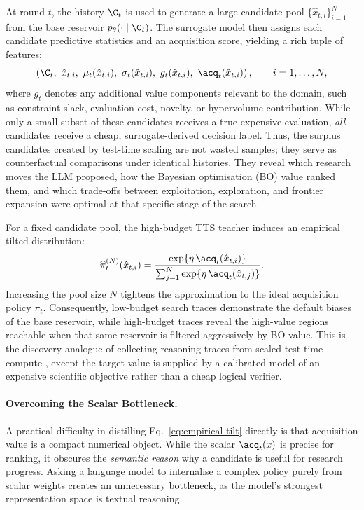 At round $t$, the history $\C_t$ is used to generate a large candidate pool $\{\hat{x}_{t,i}\}_{i=1}^{N}$ from the base reservoir $p_{\theta}(\cdot\mid\C_t)$. The surrogate model then assigns each candidate predictive statistics and an acquisition score, yielding a rich tuple of features:
\[
  \left(
    \C_t,\ \hat{x}_{t,i},\ 
    \mu_t(\hat{x}_{t,i}),\ 
    \sigma_t(\hat{x}_{t,i}),\ 
    g_t(\hat{x}_{t,i}),\ 
    \acq_t(\hat{x}_{t,i})
  \right),
  \qquad i=1,\ldots,N,
\]
where $g_t$ denotes any additional value components relevant to the domain, such as constraint slack, evaluation cost, novelty, or hypervolume contribution. While only a small subset of these candidates receives a true expensive evaluation, \emph{all} candidates receive a cheap, surrogate-derived decision label. Thus, the surplus candidates created by test-time scaling are not wasted samples; they serve as counterfactual comparisons under identical histories. They reveal which research moves the LLM proposed, how the Bayesian optimisation (BO) value ranked them, and which trade-offs between exploitation, exploration, and frontier expansion were optimal at that specific stage of the search.

For a fixed candidate pool, the high-budget TTS teacher induces an empirical tilted distribution:
\begin{equation}
\label{eq:empirical-tilt}
  \widehat{\pi}^{(N)}_t(\hat{x}_{t,i})
  =
  \frac{\exp\{\eta\,\acq_t(\hat{x}_{t,i})\}}
       {\sum_{j=1}^{N}\exp\{\eta\,\acq_t(\hat{x}_{t,j})\}} .
\end{equation}
Increasing the pool size $N$ tightens the approximation to the ideal acquisition policy $\pi_t$. Consequently, low-budget search traces demonstrate the default biases of the base reservoir, while high-budget traces reveal the high-value regions reachable when that same reservoir is filtered aggressively by BO value. This is the discovery analogue of collecting reasoning traces from scaled test-time compute \citep{snellScalingLLMTestTime2024,wangTutorialLLMReasoning2025}, except the target value is supplied by a calibrated model of an expensive scientific objective rather than a cheap logical verifier.

\paragraph{Overcoming the Scalar Bottleneck.}
A practical difficulty in distilling Eq.~\eqref{eq:empirical-tilt} directly is that acquisition value is a compact numerical object. While the scalar $\acq_t(x)$ is precise for ranking, it obscures the \emph{semantic reason} why a candidate is useful for research progress. Asking a language model to internalise a complex policy purely from scalar weights creates an unnecessary bottleneck, as the model's strongest representation space is textual reasoning.

